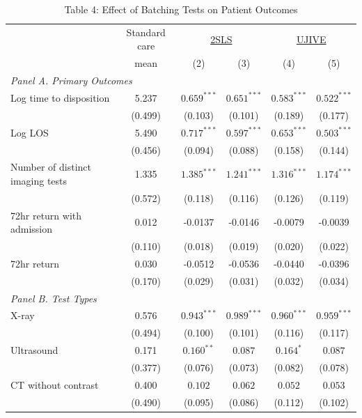 \documentclass[11pt]{article}
\newcommand{\1}{\hbox{\rm 1\kern-.35em 1}}
\begin{document}
\begin{table}[t!]
\centering
\caption*{Table 4: Effect of Batching Tests on Patient Outcomes}
\begin{threeparttable}
\begin{tabular}{lccccc}
\toprule
& Standard care & \multicolumn{2}{c}{\underline{2SLS}} & \multicolumn{2}{c}{\underline{UJIVE}} \\
& mean & (2) & (3) & (4) & (5) \\
\midrule
\multicolumn{6}{l}{\textit{Panel A. Primary Outcomes}} \\[0.5em]
Log time to disposition 
& 5.237 
& $0.659^{***}$ & $0.651^{***}$
& $0.583^{***}$ & $0.522^{***}$ \\
& (0.499)
& (0.103) & (0.101)
& (0.189) & (0.177) \\[0.5em]
Log LOS
& 5.490
& $0.717^{***}$ & $0.597^{***}$
& $0.653^{***}$ & $0.503^{***}$ \\
& (0.456)
& (0.094) & (0.088)
& (0.158) & (0.144) \\[0.5em]
Number of distinct imaging tests 
& 1.335
& $1.385^{***}$ & $1.241^{***}$
& $1.316^{***}$ & $1.174^{***}$ \\
& (0.572)
& (0.118) & (0.116)
& (0.126) & (0.119) \\[0.5em]
72hr return with admission 
& 0.012
& -0.0137 & -0.0146
& -0.0079 & -0.0039 \\
& (0.110)
& (0.018) & (0.019)
& (0.020) & (0.022) \\[0.5em]
72hr return 
& 0.030
& -0.0512 & -0.0536
& -0.0440 & -0.0396 \\
& (0.170)
& (0.029) & (0.031)
& (0.032) & (0.034) \\[0.5em]
\multicolumn{6}{l}{\textit{Panel B. Test Types}} \\[0.5em]
X-ray 
& 0.576
& $0.943^{***}$ & $0.989^{***}$
& $0.960^{***}$ & $0.959^{***}$ \\
& (0.494)
& (0.100) & (0.101)
& (0.116) & (0.117) \\[0.5em]

Ultrasound 
& 0.171
& $0.160^{**}$ & $0.087$
& $0.164^{*}$ & $0.087$ \\
& (0.377)
& (0.076) & (0.073)
& (0.082) & (0.078) \\[0.5em]

CT without contrast 
& 0.400
& $0.102$ & $0.062$
& $0.052$ & $0.053$ \\
& (0.490)
& (0.095) & (0.086)
& (0.112) & (0.102) \\[0.5em]


\end{tabular}
\end{threeparttable}
\end{table}
\end{document}
